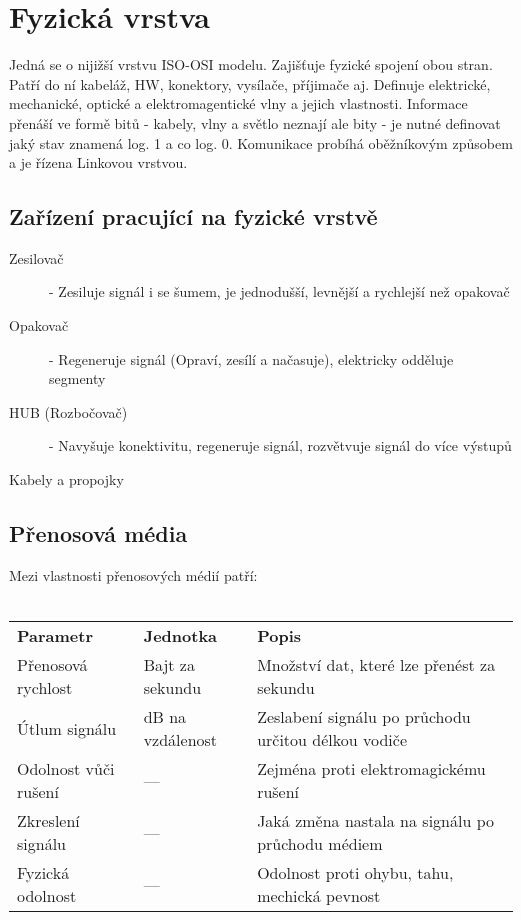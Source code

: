 \section{Fyzická vrstva}
\label{sec:fyzicka-vrstva}
Jedná se o nijižší vrstvu ISO-OSI modelu.
Zajišťuje fyzické spojení obou stran.
Patří do ní kabeláž, HW, konektory, vysílače, příjimače aj.
Definuje elektrické, mechanické, optické a elektromagentické vlny a jejich vlastnosti.
Informace přenáší ve formě bitů - kabely, vlny a světlo neznají ale bity - je nutné definovat jaký stav znamená log. 1 a co log. 0.
Komunikace probíhá oběžníkovým způsobem a je řízena Linkovou vrstvou.
\subsection{Zařízení pracující na fyzické vrstvě}
\begin{description}
  \item[Zesilovač]- Zesiluje signál i se šumem, je jednodušší, levnější a rychlejší než opakovač
  \item[Opakovač]- Regeneruje signál (Opraví, zesílí a načasuje), elektricky odděluje segmenty
  \item[HUB (Rozbočovač)]- Navyšuje konektivitu, regeneruje signál, rozvětvuje signál do více výstupů
  \item[Kabely a propojky]
\end{description}
\subsection{Přenosová média}
Mezi vlastnosti přenosových médií patří:\\\\
\begin{tabularx}{\linewidth}{l|l|l}
  \textbf{Parametr}    & \textbf{Jednotka} & \textbf{Popis}                                      \\
  Přenosová rychlost   & Bajt za sekundu   & Množství dat, které lze přenést za sekundu          \\
  \hline
  Útlum signálu        & dB na vzdálenost  & Zeslabení signálu po průchodu určitou délkou vodiče \\
  \hline
  Odolnost vůči rušení & ---               & Zejména proti elektromagickému rušení               \\
  \hline
  Zkreslení signálu    & ---               & Jaká změna nastala na signálu po průchodu médiem    \\
  \hline
  Fyzická odolnost     & ---               & Odolnost proti ohybu, tahu, mechická pevnost        \\
\end{tabularx}
